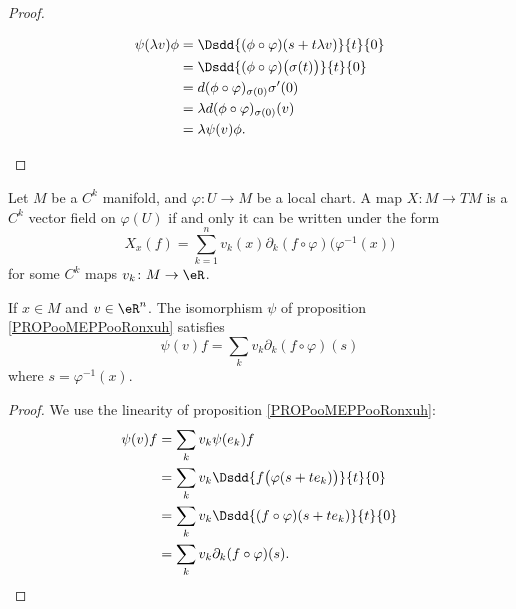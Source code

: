 \begin{proof}
\begin{subproof}
		\begin{subequations}
			\begin{align}
				\psi(\lambda v)\phi & =\Dsdd{ (\phi\circ\varphi)(s+t\lambda v) }{t}{0}        \\
				                    & =\Dsdd{ (\phi\circ\varphi)\big( \sigma(t) \big) }{t}{0} \\
				                    & =d(\phi\circ\varphi)_{\sigma(0)}\sigma'(0)              \\
				                    & =\lambda d(\phi\circ\varphi)_{\sigma(0)}(v)             \\
				                    & =\lambda\psi(v)\phi.
			\end{align}
		\end{subequations}
	\end{subproof}
\end{proof}

\begin{lemma}        \label{LEMooZWFAooDlYaJm}
	Let \( M\) be a \( C^k\) manifold, and \( \varphi\colon U\to M\) be a local chart. A map \( X\colon M\to TM\) is a \( C^k\) vector field on \( \varphi(U)\) if and only it can be written under the form
	\begin{equation}
		X_x(f)=\sum_{k=1}^nv_k(x)\partial_k(f\circ\varphi)\big( \varphi^{-1}(x) \big)
	\end{equation}
	for some \( C^k\) maps \( v_k\colon M\to \eR\).
\end{lemma}

\begin{lemma}       \label{LEMooIQZWooOSLNXB}
	If \( x\in M\) and \( v\in \eR^n\). The isomorphism \( \psi\) of proposition \ref{PROPooMEPPooRonxuh} satisfies
	\begin{equation}        \label{EQooBVOBooBTfYWC}
		\psi(v)f=\sum_kv_k\partial_k(f\circ\varphi)(s)
	\end{equation}
	where \( s=\varphi^{-1}(x)\).
\end{lemma}

\begin{proof}
	We use the linearity of proposition \ref{PROPooMEPPooRonxuh}:
	\begin{subequations}
		\begin{align}
			\psi(v)f & =\sum_kv_k\psi(e_k)f                                  \\
			         & =\sum_kv_k\Dsdd{ f\big( \varphi(s+te_k) \big) }{t}{0} \\
			         & =\sum_kv_k\Dsdd{ (f\circ\varphi)(s+te_k) }{t}{0}      \\
			         & =\sum_kv_k\partial_k(f\circ\varphi)(s).
		\end{align}
	\end{subequations}
\end{proof}

